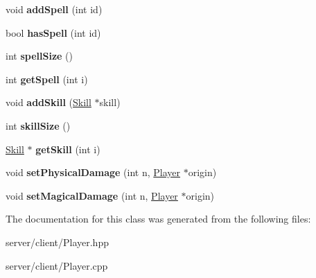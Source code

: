 \begin{DoxyCompactItemize}
\item 
\hypertarget{class_player_ad157336ca42792e6e18d5234b2d62fe3}{void {\bfseries add\-Spell} (int id)}\label{class_player_ad157336ca42792e6e18d5234b2d62fe3}

\item 
\hypertarget{class_player_abbccd20e0643cca907e2ed7734fecd80}{bool {\bfseries has\-Spell} (int id)}\label{class_player_abbccd20e0643cca907e2ed7734fecd80}

\item 
\hypertarget{class_player_ac1729c2a4693ab5dc10918850bf1e9ec}{int {\bfseries spell\-Size} ()}\label{class_player_ac1729c2a4693ab5dc10918850bf1e9ec}

\item 
\hypertarget{class_player_ade41a318d1540fc0fb5b59066c0808a8}{int {\bfseries get\-Spell} (int i)}\label{class_player_ade41a318d1540fc0fb5b59066c0808a8}

\item 
\hypertarget{class_player_aa9e3c957e954f10f349db4a9a285cb0f}{void {\bfseries add\-Skill} (\hyperlink{class_skill}{Skill} $\ast$skill)}\label{class_player_aa9e3c957e954f10f349db4a9a285cb0f}

\item 
\hypertarget{class_player_ae5c5de0d8b6afb026c705d18ca7f7826}{int {\bfseries skill\-Size} ()}\label{class_player_ae5c5de0d8b6afb026c705d18ca7f7826}

\item 
\hypertarget{class_player_a03bf82e92f62f528e369b1eed215d0e9}{\hyperlink{class_skill}{Skill} $\ast$ {\bfseries get\-Skill} (int i)}\label{class_player_a03bf82e92f62f528e369b1eed215d0e9}

\item 
\hypertarget{class_player_aecec584a3bc61d805c14e3772d1dfbde}{void {\bfseries set\-Physical\-Damage} (int n, \hyperlink{class_player}{Player} $\ast$origin)}\label{class_player_aecec584a3bc61d805c14e3772d1dfbde}

\item 
\hypertarget{class_player_ad385dbbf0ebf4fecefca5e409498a424}{void {\bfseries set\-Magical\-Damage} (int n, \hyperlink{class_player}{Player} $\ast$origin)}\label{class_player_ad385dbbf0ebf4fecefca5e409498a424}

\end{DoxyCompactItemize}


The documentation for this class was generated from the following files\-:\begin{DoxyCompactItemize}
\item 
server/client/Player.\-hpp\item 
server/client/Player.\-cpp\end{DoxyCompactItemize}
